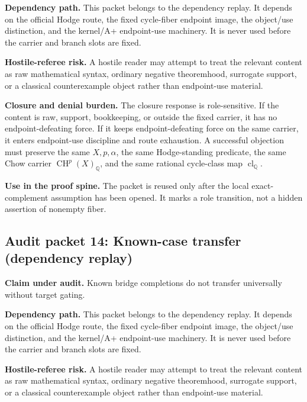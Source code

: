 \documentclass[11pt]{article}
\newcommand{\QQ}{\mathbb{Q}}
\newcommand{\CH}{\operatorname{CH}}
\newcommand{\clQ}{\operatorname{cl}_{\QQ}}
\begin{document}
\par\noindent\textbf{Dependency path.} This packet belongs to the dependency replay. It depends on the official Hodge route, the fixed cycle-fiber endpoint image, the object/use distinction, and the kernel/A+ endpoint-use machinery. It is never used before the carrier and branch slots are fixed.


\par\noindent\textbf{Hostile-referee risk.} A hostile reader may attempt to treat the relevant content as raw mathematical syntax, ordinary negative theoremhood, surrogate support, or a classical counterexample object rather than endpoint-use material.


\par\noindent\textbf{Closure and denial burden.} The closure response is role-sensitive. If the content is raw, support, bookkeeping, or outside the fixed carrier, it has no endpoint-defeating force. If it keeps endpoint-defeating force on the same carrier, it enters endpoint-use discipline and route exhaustion. A successful objection must preserve the same $X,p,\alpha$, the same Hodge-standing predicate, the same Chow carrier $\CH^p(X)_\QQ$, and the same rational cycle-class map $\clQ$.


\par\noindent\textbf{Use in the proof spine.} The packet is reused only after the local exact-complement assumption has been opened. It marks a role transition, not a hidden assertion of nonempty fiber.


\subsection{Audit packet 14: Known-case transfer (dependency replay)}


\par\noindent\textbf{Claim under audit.} Known bridge completions do not transfer universally without target gating.


\par\noindent\textbf{Dependency path.} This packet belongs to the dependency replay. It depends on the official Hodge route, the fixed cycle-fiber endpoint image, the object/use distinction, and the kernel/A+ endpoint-use machinery. It is never used before the carrier and branch slots are fixed.


\par\noindent\textbf{Hostile-referee risk.} A hostile reader may attempt to treat the relevant content as raw mathematical syntax, ordinary negative theoremhood, surrogate support, or a classical counterexample object rather than endpoint-use material.
\end{document}
